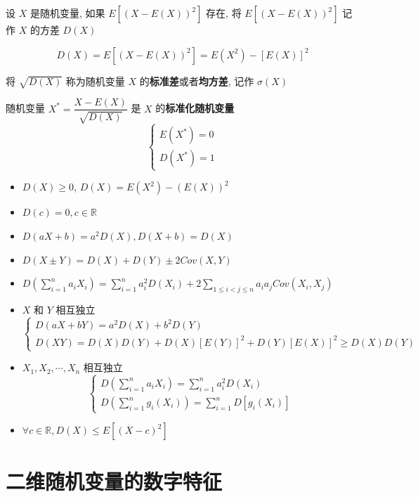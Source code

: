 \begin{definition}[方差和标准差]
	设 $X$ 是随机变量, 如果 $E[(X-E(X))^{2}]$ 存在, 将 $E[(X-E(X))^{2}]$ 记作 $X$ 的方差 $D(X)$ 
	
	$$D(X) = E[(X-E(X))^{2}] = E(X^{2})-[E(X)]^2$$
	
	将 $\sqrt{D(X)}$ 称为随机变量 $X$ 的\textbf{标准差}或者\textbf{均方差}, 记作 $\sigma(X)$

	随机变量 $X^{*} = \dfrac{X - E(X)}{\sqrt{D(X)}}$ 是 $X$ 的\textbf{标准化随机变量}
	$$\begin{cases}
		E(X^{*}) = 0\\
		D(X^{*}) = 1
	\end{cases}$$
	
\end{definition}

\begin{corollary}[方差和标准差推论]
	\begin{itemize}
		\item $D(X)\geq 0$, $D(X) = E(X^2) - (E(X))^{2}$
		\item $D(c)=0, c\in \mathbb{R}$
		\item $D(aX + b) = a^{2}D(X), D(X + b) = D(X)$ 
		\item $D(X\pm Y) = D(X) + D(Y) \pm 2Cov(X,Y)$
		\item $D\left(\sum\limits_{i = 1}^{n}a_{i}X_{i}\right) = \sum\limits_{i = 1}^{n}a_{i}^{2}D(X_{i}) + 2 \sum\limits_{1 \leq i < j\leq n}a_{i}a_{j} Cov(X_{i},X_{j})$
		\item $X$ 和 $Y$ 相互独立 
		$$\begin{cases}
			D(aX + bY) = a^{2}D(X) + b^{2}D(Y)\\
			D(XY) = D(X)D(Y) + D(X)[E(Y)]^{2} + D(Y)[E(X)]^{2}\geq D(X)D(Y)
		\end{cases}$$
		\item $X_{1}, X_{2}, \cdots,X_{n}$ 相互独立 
		$$\begin{cases}
			D\left(\sum\limits_{i = 1}^{n}a_{i}X_{i}\right) = \sum\limits_{i = 1}^{n}a_{i}^{2}D(X_{i})\\
			D\left(\sum\limits_{i = 1}^{n}g_{i}(X_{i})\right) = \sum\limits_{i = 1}^{n}D\left[g_{i}(X_{i})\right]
		\end{cases}$$
		\item $\forall c\in \mathbb{R}, D(X) \leq E\left[(X-c)^{2}\right]$
	\end{itemize}
\end{corollary}


\section{二维随机变量的数字特征}

